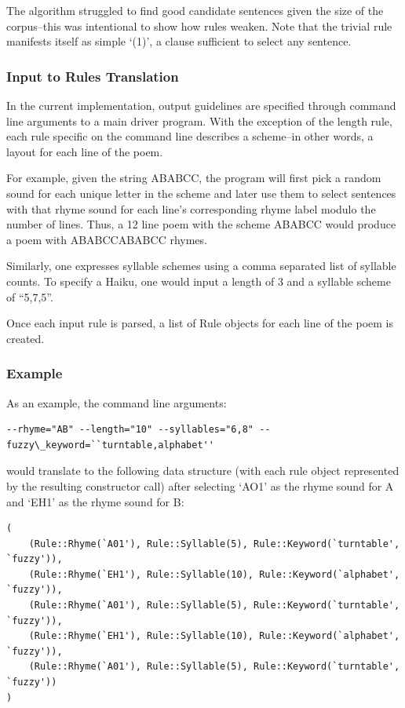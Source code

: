 \documentclass[10pt]{article}
\begin{document}
The algorithm struggled to find good candidate sentences given the size of the
corpus--this was intentional to show how rules weaken. Note that the trivial
rule manifests itself as simple `(1)', a clause sufficient to select any
sentence.

\subsubsection{Input to Rules Translation}
In the current implementation, output guidelines are specified through command
line arguments to a main driver program. With the exception of the length rule,
each rule specific on the command line describes a scheme--in other words, a
layout for each line of the poem.

For example, given the string ABABCC, the program will first pick a random
sound for each unique letter in the scheme and later use them to select
sentences with that rhyme sound for each line's corresponding rhyme label
modulo the number of lines. Thus, a 12 line poem with the scheme ABABCC would
produce a poem with ABABCCABABCC rhymes.

Similarly, one expresses syllable schemes using a comma separated list of
syllable counts. To specify a Haiku, one would input a length of 3 and a
syllable scheme of ``5,7,5''.

Once each input rule is parsed, a list of Rule objects for each line of the
poem is created. 

\subsubsection{Example}
As an example, the command line arguments:
\begin{verbatim}
--rhyme="AB" --length="10" --syllables="6,8" --fuzzy\_keyword=``turntable,alphabet''
\end{verbatim}
would translate to the following data structure (with each rule object
represented by the resulting constructor call) after selecting `AO1' as the
rhyme sound for A and `EH1' as the rhyme sound for B:

\begin{verbatim}
(
    (Rule::Rhyme(`A01'), Rule::Syllable(5), Rule::Keyword(`turntable', `fuzzy')),
    (Rule::Rhyme(`EH1'), Rule::Syllable(10), Rule::Keyword(`alphabet', `fuzzy')),
    (Rule::Rhyme(`A01'), Rule::Syllable(5), Rule::Keyword(`turntable', `fuzzy')),
    (Rule::Rhyme(`EH1'), Rule::Syllable(10), Rule::Keyword(`alphabet', `fuzzy')),
    (Rule::Rhyme(`A01'), Rule::Syllable(5), Rule::Keyword(`turntable', `fuzzy'))
)
\end{verbatim}
\end{document}
